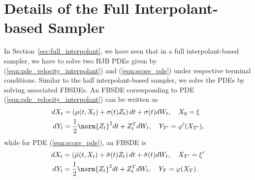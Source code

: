 \section{Details of the Full Interpolant-based Sampler}\label{apndx:full_interpolant}
In Section~\ref{sec:full_interpolant}, we have seen that in a full interpolant-based sampler, we have to solve two HJB PDEs given by (\ref{eqn:pde_velocity_interpolant}) and (\ref{eqn:score_pde}) under respective terminal conditions. Similar to the half interpolant-based sampler, we solve the PDEs by solving associated FBSDEs. An FBSDE corresponding to PDE (\ref{eqn:pde_velocity_interpolant}) can be written as
\begin{equation}\label{eqn:fbsde_velocity_interpolant}
\begin{split}
    dX_t &= \left(\mu(t,X_t)+\sigma(t) Z_t\right)dt+\sigma(t)dW_t,\quad X_0 = \xi\\
    dY_t &= \frac{1}{2}\norm{Z_t}^2dt + Z_t^TdW_t,\quad Y_{T'} = \varphi'(X_{T'}),
\end{split}
\end{equation}
while for PDE (\ref{eqn:score_pde}), an FBSDE is
\begin{equation}\label{eqn:fbsde_score_interpolant}
\begin{split}   
    dX_t &= \left(\bar{\mu}(t,X_t)+\bar{\sigma}(t) Z_t\right)dt+\bar{\sigma}(t)dW_t,\quad X_{T'} = \xi'\\
    dY_t &= \frac{1}{2}\norm{Z_t}^2dt + Z_t^TdW_t,\quad Y_{T} = \varphi(X_T).
\end{split}
\end{equation}

